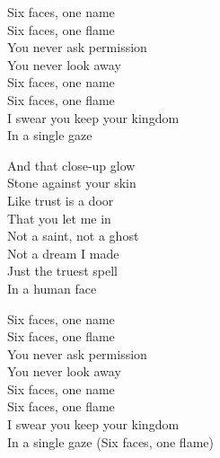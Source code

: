 \begin{lyrics}
Six faces, one name\\
Six faces, one flame\\
You never ask permission\\
You never look away\\
Six faces, one name\\
Six faces, one flame\\
I swear you keep your kingdom\\
In a single gaze

And that close-up glow\\
Stone against your skin\\
Like trust is a door\\
That you let me in\\
Not a saint, not a ghost\\
Not a dream I made\\
Just the truest spell\\
In a human face

Six faces, one name\\
Six faces, one flame\\
You never ask permission\\
You never look away\\
Six faces, one name\\
Six faces, one flame\\
I swear you keep your kingdom\\
In a single gaze
(Six faces, one flame)
\end{lyrics}

